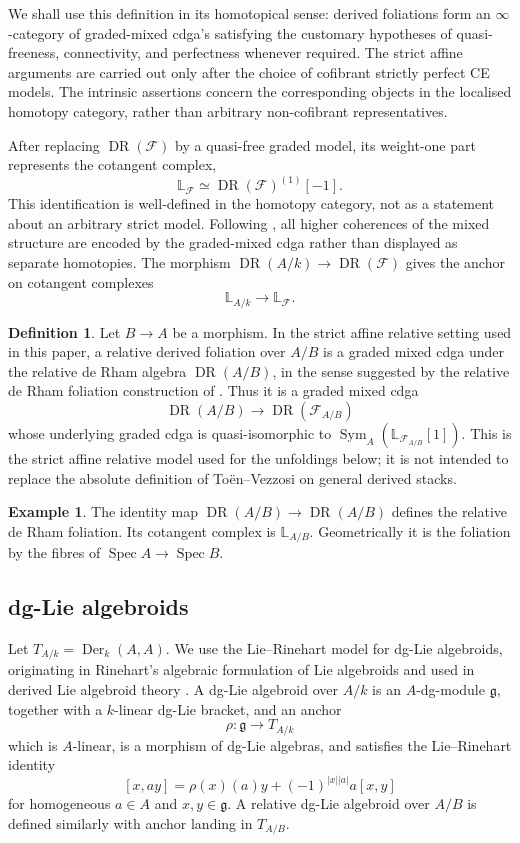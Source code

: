 \documentclass[11pt,reqno,a4paper,dvipsnames,x11names]{amsart}
\numberwithin{equation}{section}
\theoremstyle{plain}
\theoremstyle{definition}
\newtheorem{definition}[theorem]{Definition}
\newtheorem{example}[theorem]{Example}
\theoremstyle{remark}
\DeclareMathOperator{\Spec}{Spec}
\DeclareMathOperator{\Sym}{Sym}
\DeclareMathOperator{\Der}{Der}
\DeclareMathOperator{\DR}{DR}
\newcommand{\kk}{k}
\newcommand{\cF}{\mathcal F}
\newcommand{\g}{\mathfrak g}
\newcommand{\bbL}{\mathbb L}
\newcommand{\from}{\colon}
\begin{document}
We shall use this definition in its homotopical sense: derived foliations form an \(\infty\)-category of graded-mixed cdga's satisfying the customary hypotheses of quasi-freeness, connectivity, and perfectness whenever required. The strict affine arguments are carried out only after the choice of cofibrant strictly perfect CE models. The intrinsic assertions concern the corresponding objects in the localised homotopy category, rather than arbitrary non-cofibrant representatives.

After replacing \(\DR(\cF)\) by a quasi-free graded model, its weight-one part represents the cotangent complex,
\[
 \bbL_\cF\simeq\DR(\cF)^{(1)}[-1].
\]
This identification is well-defined in the homotopy category, not as a statement about an arbitrary strict model. Following \cite[Corollary~1.6.0.4]{TV}, all higher coherences of the mixed structure are encoded by the graded-mixed cdga rather than displayed as separate homotopies. The morphism \(\DR(A/\kk)\to\DR(\cF)\) gives the anchor on cotangent complexes
\[
 \bbL_{A/\kk}\longrightarrow \bbL_\cF.
\]

\begin{definition}
Let \(B\to A\) be a morphism. In the strict affine relative setting used in this paper, a relative derived foliation over \(A/B\) is a graded mixed cdga under the relative de Rham algebra \(\DR(A/B)\), in the sense suggested by the relative de Rham foliation construction of \cite[Section~2.1]{TV}. Thus it is a graded mixed cdga
\[
 \DR(A/B)\longrightarrow \DR(\cF_{A/B})
\]
whose underlying graded cdga is quasi-isomorphic to \(\Sym_A(\bbL_{\cF_{A/B}}[1])\). This is the strict affine relative model used for the unfoldings below; it is not intended to replace the absolute definition of To\"en--Vezzosi on general derived stacks.
\end{definition}

\begin{example}
The identity map
$
 \DR(A/B)\longrightarrow \DR(A/B)$
defines the relative de Rham foliation. Its cotangent complex is \(\bbL_{A/B}\). Geometrically it is the foliation by the fibres of \(\Spec A\to\Spec B\).
\end{example}

\subsection{dg-Lie algebroids}

Let \(T_{A/\kk}=\Der_\kk(A,A)\). We use the Lie--Rinehart model for dg-Lie algebroids, originating in Rinehart's algebraic formulation of Lie algebroids and used in derived Lie algebroid theory \cite{Rinehart63,Nuiten,TVRH,TV}. A dg-Lie algebroid over \(A/\kk\) is an \(A\)-dg-module \(\g\), together with a \(\kk\)-linear dg-Lie bracket, and an anchor
\[
 \rho\from \g\longrightarrow T_{A/\kk}
\]
which is \(A\)-linear, is a morphism of dg-Lie algebras, and satisfies the Lie--Rinehart identity
\[
 [x,ay]=\rho(x)(a)y+(-1)^{|x||a|}a[x,y]
\]
for homogeneous \(a\in A\) and \(x,y\in\g\). A relative dg-Lie algebroid over \(A/B\) is defined similarly with anchor landing in \(T_{A/B}\).
\end{document}
